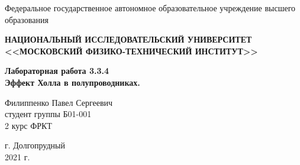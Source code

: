 \begin{center}
    
    \normalsize{Федеральное государственное автономное образовательное учреждение высшего образования}
    
    \textbf{НАЦИОНАЛЬНЫЙ ИССЛЕДОВАТЕЛЬСКИЙ УНИВЕРСИТЕТ \\ <<МОСКОВСКИЙ ФИЗИКО-ТЕХНИЧЕСКИЙ ИНСТИТУТ>>}
    \vspace{13ex}
    
    \textbf{Лабораторная работа 3.3.4 \\ Эффект Холла в полупроводниках.}
    \vspace{40ex}
    
    \normalsize{Филиппенко Павел Сергеевич \\ студент группы Б01-001\\ 2 курс ФРКТ\\}
\end{center}
    
\vfill 
    
\begin{center}
г. Долгопрудный\\ 
2021 г.
\end{center}


\thispagestyle{empty} %
\newpage